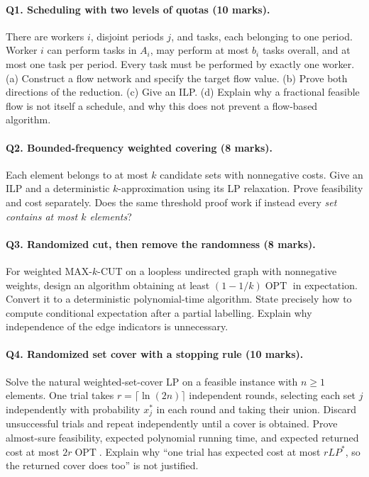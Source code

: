 \documentclass[10pt]{article}
\theoremstyle{definition}
\newcommand{\OPT}{\operatorname{OPT}}
\begin{document}
\paragraph{Q1. Scheduling with two levels of quotas (10 marks).}
There are workers $i$, disjoint periods $j$, and tasks, each belonging to
one period.  Worker $i$ can perform tasks in $A_i$, may perform at most
$b_i$ tasks overall, and at most one task per period.  Every task must be
performed by exactly one worker.
(a) Construct a flow network and specify the target flow value.
(b) Prove both directions of the reduction.  (c) Give an ILP.
(d) Explain why a fractional feasible flow is not itself a schedule, and
why this does not prevent a flow-based algorithm.

\paragraph{Q2. Bounded-frequency weighted covering (8 marks).}
Each element belongs to at most $k$ candidate sets with nonnegative costs.
Give an ILP and a deterministic $k$-approximation using its LP relaxation.
Prove feasibility and cost separately.  Does the same threshold proof work
if instead every \emph{set contains at most $k$ elements}?

\paragraph{Q3. Randomized cut, then remove the randomness (8 marks).}
For weighted MAX-$k$-CUT on a loopless undirected graph with nonnegative
weights, design an algorithm obtaining at least $(1-1/k)\OPT$ in expectation.
Convert it to a deterministic polynomial-time algorithm.  State precisely
how to compute conditional expectation after a partial labelling.  Explain
why independence of the edge indicators is unnecessary.

\paragraph{Q4. Randomized set cover with a stopping rule (10 marks).}
Solve the natural weighted-set-cover LP on a feasible instance with $n\ge1$
elements.  One trial takes $r=\lceil\ln(2n)\rceil$ independent rounds,
selecting each set $j$ independently with probability $x_j^*$ in each round
and taking their union.  Discard unsuccessful trials and repeat independently
until a cover is obtained.  Prove almost-sure feasibility, expected polynomial
running time, and expected returned cost at most $2r\OPT$.  Explain why
``one trial has expected cost at most $rLP^*$, so the returned cover does
too'' is not justified.
\end{document}
